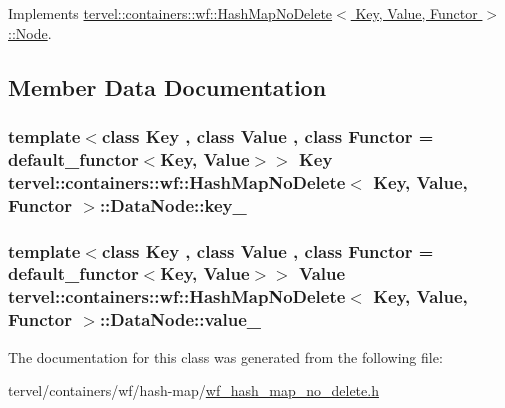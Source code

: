 Implements \hyperlink{classtervel_1_1containers_1_1wf_1_1_hash_map_no_delete_1_1_node_a03ef6395f93104d0313296773be36b3c}{tervel\+::containers\+::wf\+::\+Hash\+Map\+No\+Delete$<$ Key, Value, Functor $>$\+::\+Node}.



\subsection{Member Data Documentation}
\hypertarget{classtervel_1_1containers_1_1wf_1_1_hash_map_no_delete_1_1_data_node_af9ccfc5066e8ccc8c651e01f5968233e}{}
\subsubsection[{key\+\_\+}]{\setlength{\rightskip}{0pt plus 5cm}template$<$class Key , class Value , class Functor  = default\+\_\+functor$<$\+Key, Value$>$$>$ Key {\bf tervel\+::containers\+::wf\+::\+Hash\+Map\+No\+Delete}$<$ Key, {\bf Value}, Functor $>$\+::Data\+Node\+::key\+\_\+}\label{classtervel_1_1containers_1_1wf_1_1_hash_map_no_delete_1_1_data_node_af9ccfc5066e8ccc8c651e01f5968233e}
\hypertarget{classtervel_1_1containers_1_1wf_1_1_hash_map_no_delete_1_1_data_node_a2f452c674e936fcfa45edee4b0416ea4}{}
\subsubsection[{value\+\_\+}]{\setlength{\rightskip}{0pt plus 5cm}template$<$class Key , class Value , class Functor  = default\+\_\+functor$<$\+Key, Value$>$$>$ {\bf Value} {\bf tervel\+::containers\+::wf\+::\+Hash\+Map\+No\+Delete}$<$ Key, {\bf Value}, Functor $>$\+::Data\+Node\+::value\+\_\+}\label{classtervel_1_1containers_1_1wf_1_1_hash_map_no_delete_1_1_data_node_a2f452c674e936fcfa45edee4b0416ea4}


The documentation for this class was generated from the following file\+:\begin{DoxyCompactItemize}
\item 
tervel/containers/wf/hash-\/map/\hyperlink{wf__hash__map__no__delete_8h}{wf\+\_\+hash\+\_\+map\+\_\+no\+\_\+delete.\+h}\end{DoxyCompactItemize}
